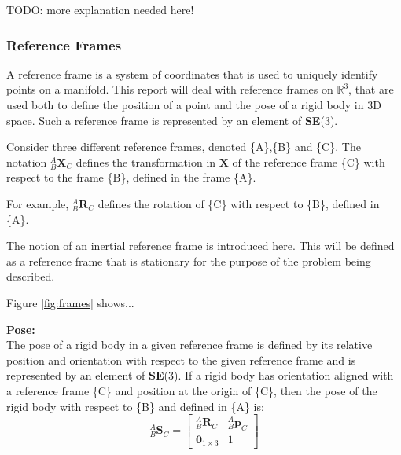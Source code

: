 		TODO: more explanation needed here!
		
	\subsubsection{Reference Frames}
		A reference frame is a system of coordinates that is used to uniquely identify points on a manifold. This report will deal with reference frames on $\mathbb{R}^3$, that are used both to define the position of a point and the pose of a rigid body in 3D space.
		Such a reference frame is represented by an element of \textbf{SE}(3).
		
		Consider three different reference frames, denoted \{A\},\{B\} and \{C\}.
		The notation $^{A}_{B}\mathbf{X}^{}_{C}$ defines the transformation in $\mathbf{X}$ of the reference frame \{C\} with respect to the frame \{B\}, defined in the frame \{A\}.
		
		For example, $^{A}_{B}\mathbf{R}^{}_{C}$ defines the rotation of \{C\} with respect to \{B\}, defined in \{A\}.
		
		The notion of an inertial reference frame is introduced here. This will be defined as a reference frame that is stationary for the purpose of the problem being described. 
		
		Figure \ref{fig:frames} shows...
		
		
		\textbf{Pose:}\\
		The pose of a rigid body in a given reference frame is defined by its relative position and orientation with respect to the given reference frame and is represented by an element of \textbf{SE}(3). If a rigid body has orientation aligned with a reference frame \{C\} and position at the origin of \{C\}, then the pose of the rigid body with respect to \{B\} and defined in \{A\} is:
		\begin{equation}
			{^{A}_{B}\mathbf{S}^{}_{C}} = 
			\begin{bmatrix}
				^{A}_{B}\mathbf{R}^{}_{C}	& 	^{A}_{B}\mathbf{p}^{}_{C}\\
				\textbf{0}_{1 \times 3} & 1						  
			\end{bmatrix}
		\end{equation}		
		
